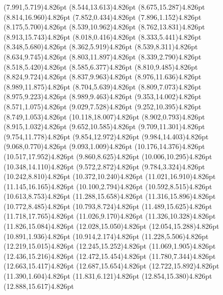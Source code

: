 \documentclass[10pt]{article}
\begin{document}
{{\qdisk(7.991,5.719){4.826pt}%
\qdisk(8.544,13.613){4.826pt}%
\qdisk(8.675,15.287){4.826pt}%
\qdisk(8.814,16.960){4.826pt}%
\qdisk(7.852,0.434){4.826pt}%
\qdisk(7.896,1.152){4.826pt}%
\qdisk(8.175,5.700){4.826pt}%
\qdisk(8.539,10.962){4.826pt}%
\qdisk(8.762,13.831){4.826pt}%
\qdisk(8.913,15.743){4.826pt}%
\qdisk(8.018,0.416){4.826pt}%
\qdisk(8.333,5.441){4.826pt}%
\qdisk(8.348,5.680){4.826pt}%
\qdisk(8.362,5.919){4.826pt}%
\qdisk(8.539,8.311){4.826pt}%
\qdisk(8.634,9.745){4.826pt}%
\qdisk(8.803,11.897){4.826pt}%
\qdisk(8.339,2.790){4.826pt}%
\qdisk(8.518,5.420){4.826pt}%
\qdisk(8.585,6.377){4.826pt}%
\qdisk(8.810,9.485){4.826pt}%
\qdisk(8.824,9.724){4.826pt}%
\qdisk(8.837,9.963){4.826pt}%
\qdisk(8.976,11.636){4.826pt}%
\qdisk(8.989,11.875){4.826pt}%
\qdisk(8.704,5.639){4.826pt}%
\qdisk(8.809,7.073){4.826pt}%
\qdisk(8.975,9.223){4.826pt}%
\qdisk(8.989,9.463){4.826pt}%
\qdisk(9.353,14.002){4.826pt}%
\qdisk(8.571,1.075){4.826pt}%
\qdisk(9.029,7.528){4.826pt}%
\qdisk(9.252,10.395){4.826pt}%
\qdisk(8.749,1.053){4.826pt}%
\qdisk(10.118,18.007){4.826pt}%
\qdisk(8.902,0.793){4.826pt}%
\qdisk(8.915,1.032){4.826pt}%
\qdisk(9.652,10.585){4.826pt}%
\qdisk(9.709,11.301){4.826pt}%
\qdisk(9.754,11.778){4.826pt}%
\qdisk(9.854,12.972){4.826pt}%
\qdisk(9.984,14.403){4.826pt}%
\qdisk(9.068,0.770){4.826pt}%
\qdisk(9.093,1.009){4.826pt}%
\qdisk(10.176,14.376){4.826pt}%
\qdisk(10.517,17.952){4.826pt}%
\qdisk(9.860,8.625){4.826pt}%
\qdisk(10.006,10.295){4.826pt}%
\qdisk(10.348,14.110){4.826pt}%
\qdisk(9.572,2.872){4.826pt}%
\qdisk(9.784,3.324){4.826pt}%
\qdisk(10.242,8.810){4.826pt}%
\qdisk(10.372,10.240){4.826pt}%
\qdisk(11.021,16.910){4.826pt}%
\qdisk(11.145,16.165){4.826pt}%
\qdisk(10.100,2.794){4.826pt}%
\qdisk(10.592,8.515){4.826pt}%
\qdisk(10.613,8.753){4.826pt}%
\qdisk(11.288,15.658){4.826pt}%
\qdisk(11.316,15.896){4.826pt}%
\qdisk(10.772,8.485){4.826pt}%
\qdisk(10.793,8.724){4.826pt}%
\qdisk(11.489,15.625){4.826pt}%
\qdisk(11.718,17.765){4.826pt}%
\qdisk(11.026,9.170){4.826pt}%
\qdisk(11.326,10.328){4.826pt}%
\qdisk(11.826,15.084){4.826pt}%
\qdisk(12.028,15.050){4.826pt}%
\qdisk(12.054,15.288){4.826pt}%
\qdisk(10.891,1.936){4.826pt}%
\qdisk(10.914,2.174){4.826pt}%
\qdisk(11.228,5.506){4.826pt}%
\qdisk(12.219,15.015){4.826pt}%
\qdisk(12.245,15.252){4.826pt}%
\qdisk(11.069,1.905){4.826pt}%
\qdisk(12.436,15.216){4.826pt}%
\qdisk(12.472,15.454){4.826pt}%
\qdisk(11.780,7.344){4.826pt}%
\qdisk(12.663,15.417){4.826pt}%
\qdisk(12.687,15.654){4.826pt}%
\qdisk(12.722,15.892){4.826pt}%
\qdisk(11.390,1.604){4.826pt}%
\qdisk(11.831,6.121){4.826pt}%
\qdisk(12.854,15.380){4.826pt}%
\qdisk(12.888,15.617){4.826pt}%
}}
\end{document}
